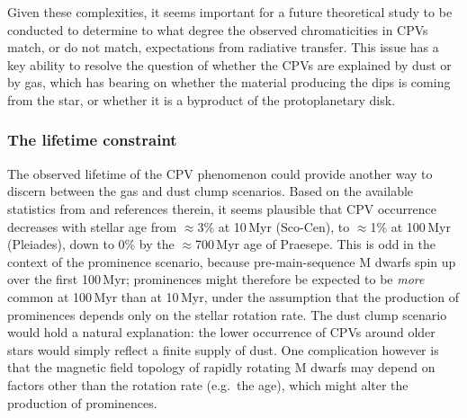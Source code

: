 \documentclass[11pt,twocolumn,tighten]{aastex63}
\begin{document}
Given these complexities, it seems important for a future theoretical
study to be conducted to determine to what degree the observed
chromaticities in CPVs match, or do not match, expectations from
radiative transfer.  This issue has a key ability to resolve the
question of whether the CPVs are explained by dust or by gas, which
has bearing on whether the material producing the dips is coming from
the star, or whether it is a byproduct of the protoplanetary disk.



\subsubsection{The lifetime constraint}

The observed lifetime of the CPV phenomenon could provide another way
to discern between the gas and dust clump scenarios.  Based on the
available statistics from \citet{2022AJ....164...80R} and
references therein, it seems plausible that CPV occurrence decreases
with stellar age from $\approx$3\% at 10\,Myr (Sco-Cen), to
$\approx$1\% at 100\,Myr (Pleiades), down to 0\% by the
$\approx$700\,Myr age of Praesepe.  This is odd in the context of the
prominence scenario, because pre-main-sequence M dwarfs spin up over
the first 100\,Myr; prominences might therefore be expected to be {\it
more} common at 100\,Myr than at 10\,Myr, under the assumption that
the production of prominences depends only on the stellar rotation
rate.  The dust clump scenario would hold a natural explanation: the
lower occurrence of CPVs around older stars would simply reflect a
finite supply of dust.  One  complication however is that the
magnetic field topology of rapidly rotating M dwarfs may depend on
factors other than the rotation rate (e.g.\ the age), which might
alter the production of prominences.



\end{document}
